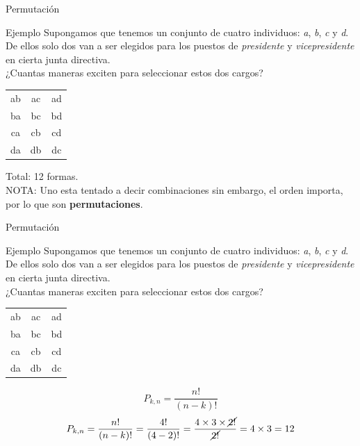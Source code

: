 \documentclass[11pt]{beamer}
\begin{document}
         \begin{frame}{Permutación}
           \begin{block}{Ejemplo}
               Supongamos que tenemos un conjunto de cuatro individuos: \textit{a}, \textit{b}, \textit{c} y \textit{d}. De ellos solo dos van a ser elegidos para los puestos de \textit{presidente} y \textit{vicepresidente} en cierta junta directiva.\\
               ¿Cuantas maneras exciten para seleccionar estos dos cargos?
           \end{block}
           \pause

           \begin{center}
               \begin{tabular}{ccc}
               ab & ac & ad \\
               ba & bc & bd \\
               ca & cb & cd \\
               da & db & dc \\
           \end{tabular}
           \end{center}
           Total: 12 formas.\\
           NOTA: Uno esta tentado a decir combinaciones sin embargo, el orden importa, por lo que son \textbf{permutaciones}.
         \end{frame}

         \begin{frame}{Permutación}
             \begin{block}{Ejemplo}
                 Supongamos que tenemos un conjunto de cuatro individuos: \textit{a}, \textit{b}, \textit{c} y \textit{d}. De ellos solo dos van a ser elegidos para los puestos de \textit{presidente} y \textit{vicepresidente} en cierta junta directiva.\\
                 ¿Cuantas maneras exciten para seleccionar estos dos cargos?
             \end{block}
             \pause
             \begin{center}
                 \begin{tabular}{ccc}
                     ab & ac & ad \\
                     ba & bc & bd \\
                     ca & cb & cd \\
                     da & db & dc \\
                 \end{tabular}
             \end{center}
             $$P_{k,n}=\dfrac{n!}{(n-k)!}$$
             $$P_{k,n}=\dfrac{n!}{(n-k)!}=\dfrac{4!}{(4-2)!}=\dfrac{4 \times 3 \times \cancel{2!}}{\cancel{2!}}= 4 \times 3 = 12$$
         \end{frame}
\end{document}
